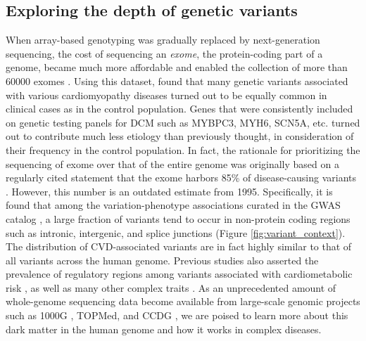 \documentclass[letter]{bioinfo}
\begin{document}
\subsection*{Exploring the depth of genetic variants}	
	When array-based genotyping was gradually replaced by next-generation sequencing, the cost of sequencing an \textit{exome}, the protein-coding part of a genome, became much more affordable and enabled the collection of more than 60000 exomes \citep{Lek:2016:Analysis}. Using this dataset, \cite{Walsh:2017:Reassessment} found that many genetic variants associated with various cardiomyopathy diseases turned out to be equally common in clinical cases as in the control population. Genes that were consistently included on genetic testing panels for DCM such as MYBPC3, MYH6, SCN5A, etc. turned out to contribute much less etiology than previously thought, in consideration of their frequency in the control population.  In fact, the rationale for prioritizing the sequencing of exome over that of the entire genome was originally based on a regularly cited statement that the exome harbors 85\% of disease-causing variants \citep{Antonarakis:2001:nature}.  However, this number is an outdated estimate from 1995.  Specifically, it is found that among the variation-phenotype associations curated in the GWAS catalog \citep{MacArthur:2017:new}, a large fraction of variants tend to occur in non-protein coding regions such as intronic, intergenic, and splice junctions (Figure \ref{fig:variant_context}). The distribution of CVD-associated variants are in fact highly similar to that of all variants across the human genome. Previous studies also asserted the prevalence of regulatory regions among variants associated with cardiometabolic risk \citep{Franzen:2016:Cardiometabolic}, as well as many other complex traits \citep{Pickrell:2014:Joint}. As an unprecedented amount of whole-genome sequencing data become available from large-scale genomic projects such as 1000G  \citep{1000G:2015:global}, TOPMed\citep{NHLBI:2014:TransOmics}, and CCDG \citep{NHGRI:2016:CCDG}, we are poised to learn more about this dark matter in the human genome and how it works in complex diseases.
\end{document}
